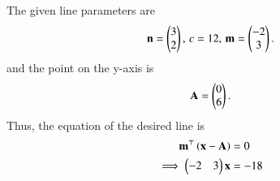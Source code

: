 		The given line
parameters are
\begin{align}
		\mathbf{n} = \begin{pmatrix}3\\2\end{pmatrix},\, c=12 ,\,
	\mathbf{m} =\begin{pmatrix}-2 \\ 3\end{pmatrix}.
\end{align}
and the point on the y-axis is
\begin{align}
	\mathbf{A} =\begin{pmatrix}0\\6\end{pmatrix}.
\end{align}
Thus, the equation of the desired line is 
\begin{align}
	\mathbf{m}^\top\left(\mathbf{x}-\mathbf{A}\right)&=0\label{eq:chapters/11/10/4/7/5}
	\\
\implies
			\begin{pmatrix}-2 & 3\end{pmatrix}\mathbf{x} &=-18
		\end{align}

